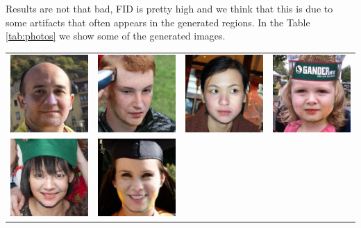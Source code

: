\documentclass[10pt,twocolumn,letterpaper]{article}
\begin{document}
Results are not that bad, FID is pretty high and we think that this is due to
some artifacts that often appears in the generated regions.
In the Table \ref{tab:photos} we show some of the generated images.
\begin{table}
  \begin{tabular}{cccc}
    \includegraphics[width=.24\linewidth]{samples/00045.jpg}&
    \includegraphics[width=.24\linewidth]{samples/00053.jpg}&
    \includegraphics[width=.24\linewidth]{samples/00099.jpg}&
    \includegraphics[width=.24\linewidth]{samples/00146.jpg}\\
    \includegraphics[width=.24\linewidth]{samples/00202.jpg}&
    \includegraphics[width=.24\linewidth]{samples/00298.jpg}&

\end{tabular}
\end{table}
\end{document}
